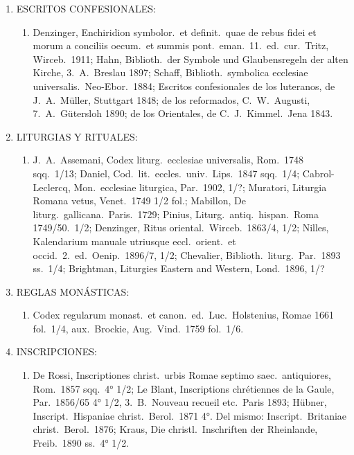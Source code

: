 \raggedbottom{} \documentclass[12pt, a4paper, openany]{book} %
\begin{document}
\begin{enumerate}
\begin{enumerate}
        \end{enumerate}
  \item ESCRITOS CONFESIONALES:\@ \begin{enumerate}
          \item Denzinger, Enchiridion symbolor.\ et definit.\ quae de rebus fidei et morum a conciliis oecum.\ et summis pont.\ eman.\ 11.\ ed.\ cur.\ Tritz, Wirceb.\ 1911; Hahn, Biblioth.\ der Symbole und Glaubensregeln der alten Kirche, 3.\ A.\ Breslau 1897; Schaff, Biblioth.\ symbolica ecclesiae universalis.\ Neo-Ebor.\ 1884; Escritos confesionales de los luteranos, de J.\ A.\ Müller, Stuttgart 1848; de los reformados, C.\ W.\ Augusti, 7.\ A.\ Gütersloh 1890; de los Orientales, de C.\ J.\ Kimmel.\ Jena 1843.
        \end{enumerate}
  \item LITURGIAS Y RITUALES:\@ \begin{enumerate}
          \item J.\ A.\ Assemani, Codex liturg.\ ecclesiae universalis, Rom.\ 1748 sqq.\ 1/13; Daniel, Cod.\ lit.\ eccles.\ univ.\ Lips.\ 1847 sqq.\ 1/4; Cabrol-Leclercq, Mon.\ ecclesiae liturgica, Par.\ 1902, 1/?; Muratori, Liturgia Romana vetus, Venet.\ 1749 1/2 fol.; Mabillon, De liturg.\ gallicana.\ Paris.\ 1729; Pinius, Liturg.\ antiq.\ hispan.\ Roma 1749/50.\ 1/2; Denzinger, Ritus oriental.\ Wirceb.\ 1863/4, 1/2; Nilles, Kalendarium manuale utriusque eccl.\ orient.\ et occid.\ 2.\ ed.\ Oenip.\ 1896/7, 1/2; Chevalier, Biblioth.\ liturg.\ Par.\ 1893 ss.\ 1/4; Brightman, Liturgies Eastern and Western, Lond.\ 1896, 1/?
        \end{enumerate}
  \item REGLAS MONÁSTICAS:\@ \begin{enumerate}
          \item Codex regularum monast.\ et canon.\ ed.\ Luc.\ Holstenius, Romae 1661 fol.\ 1/4, aux.\ Brockie, Aug.\ Vind.\ 1759 fol.\ 1/6.
        \end{enumerate}
  \item INSCRIPCIONES:\@ \begin{enumerate}
          \item De Rossi, Inscriptiones christ.\ urbis Romae septimo saec.\ antiquiores, Rom.\ 1857 sqq.\ 4° 1/2; Le Blant, Inscriptions chrétiennes de la Gaule, Par.\ 1856/65 4° 1/2, 3.\ B.\ Nouveau recueil etc.\ Paris 1893; Hübner, Inscript.\ Hispaniae christ.\ Berol.\ 1871 4°. Del mismo: Inscript.\ Britaniae christ.\ Berol.\ 1876; Kraus, Die christl.\ Inschriften der Rheinlande, Freib.\ 1890 ss.\ 4° 1/2.

\end{enumerate}
\end{enumerate}
\end{document}

